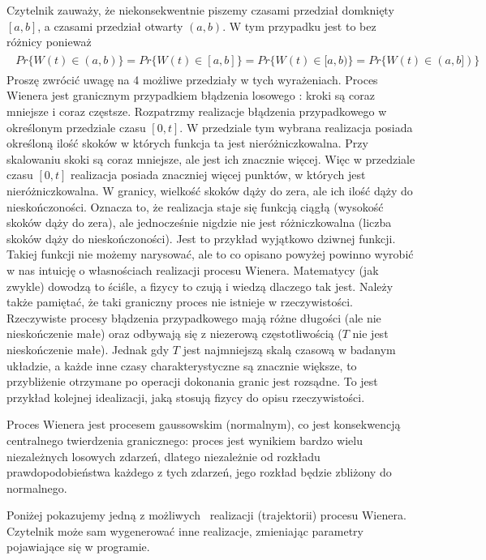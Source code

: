\documentclass[a4paper,12pt,polish]{sphinxmanual}
\begin{document}
Czytelnik zauważy, że niekonsekwentnie piszemy czasami przedział domknięty $[a, b]$, a czasami przedział otwarty $(a, b)$. W tym przypadku jest to bez różnicy ponieważ
\label{ch3/chIII021:equation-eqn15}\begin{gather}
\begin{split}Pr\{W(t) \in (a, b)\} = Pr\{W(t) \in [a, b]\} = Pr\{W(t) \in [a, b)\} = Pr\{W(t) \in (a, b])\}\end{split}\label{ch3/chIII021-eqn15}
\end{gather}
Proszę zwrócić uwagę na 4 możliwe przedziały w tych wyrażeniach.
Proces Wienera jest granicznym przypadkiem błądzenia losowego : kroki są coraz mniejsze i coraz częstsze. Rozpatrzmy realizacje błądzenia przypadkowego w określonym przedziale czasu $[0, t]$. W przedziale tym wybrana realizacja posiada określoną ilość skoków w których funkcja ta jest nieróżniczkowalna. Przy skalowaniu skoki są coraz mniejsze, ale jest ich znacznie więcej. Więc w przedziale czasu $[0, t]$ realizacja posiada znaczniej więcej punktów, w których jest nieróżniczkowalna. W granicy, wielkość skoków dąży do zera, ale ich ilość dąży do nieskończoności. Oznacza to, że realizacja staje się funkcją ciągłą (wysokość skoków dąży do zera), ale jednocześnie nigdzie nie jest różniczkowalna (liczba skoków dąży do nieskończoności). Jest to przykład wyjątkowo dziwnej funkcji. Takiej funkcji nie możemy narysować, ale to co opisano powyżej powinno wyrobić w nas intuicję o własnościach realizacji procesu Wienera. Matematycy (jak zwykle) dowodzą to ściśle, a fizycy to czują i wiedzą dlaczego tak jest. Należy także pamiętać, że taki graniczny proces nie istnieje w rzeczywistości. Rzeczywiste procesy błądzenia przypadkowego mają różne długości (ale nie nieskończenie małe) oraz odbywają się z niezerową częstotliwością ($T$ nie jest nieskończenie małe). Jednak gdy $T$ jest najmniejszą skalą czasową w badanym układzie, a każde inne czasy charakterystyczne są znacznie większe, to przybliżenie otrzymane po operacji dokonania granic jest rozsądne. To jest przykład kolejnej idealizacji, jaką stosują fizycy do opisu rzeczywistości.

Proces Wienera jest procesem gaussowskim (normalnym), co jest konsekwencją centralnego twierdzenia granicznego: proces jest wynikiem bardzo wielu niezależnych losowych zdarzeń, dlatego niezależnie od rozkładu prawdopodobieństwa każdego z tych zdarzeń, jego rozkład będzie zbliżony do normalnego.

Poniżej pokazujemy jedną z możliwych  realizacji (trajektorii) procesu Wienera. Czytelnik może sam wygenerować inne realizacje, zmieniając parametry pojawiające się w programie.
\end{document}
